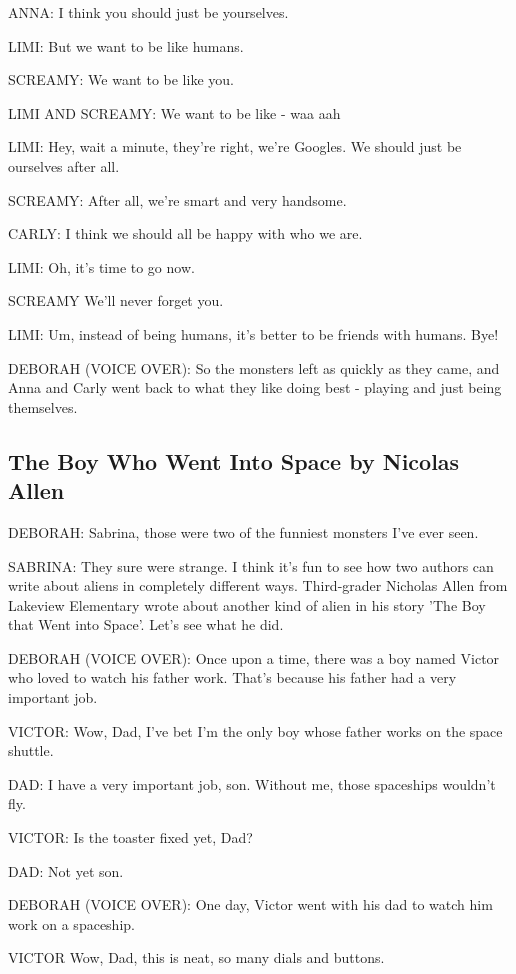 ANNA:
I think you should just be yourselves.

LIMI:
But we want to be like humans.

SCREAMY:
We want to be like you.

LIMI AND SCREAMY:
We want to be like - waa aah

LIMI:
Hey, wait a minute, they're right, we're Googles.
We should just be ourselves after all.

SCREAMY:
After all, we're smart and very handsome.

CARLY:
I think we should all be happy with who we are.

LIMI:
Oh, it's time to go now.

SCREAMY
We'll never forget you.

LIMI:
Um, instead of being humans, it's better to be friends with humans.
Bye!

DEBORAH (VOICE OVER):
So the monsters left as quickly as they came, and Anna and Carly went back to what they like doing best - playing and just being themselves.

\subsection{The Boy Who Went Into Space by Nicolas Allen}

DEBORAH:
Sabrina, those were two of the funniest monsters I've ever seen.

SABRINA:
They sure were strange.
I think it's fun to see how two authors can write about aliens in completely different ways.
Third-grader Nicholas Allen from Lakeview Elementary wrote about another kind of alien in his story 'The Boy that Went into Space'.
Let's see what he did.

DEBORAH (VOICE OVER):
Once upon a time, there was a boy named Victor who loved to watch his father work.
That's because his father had a very important job.

VICTOR:
Wow, Dad, I've bet I'm the only boy whose father works on the space shuttle.

DAD:
I have a very important job, son.
Without me, those spaceships wouldn't fly.

VICTOR:
Is the toaster fixed yet, Dad?

DAD:
Not yet son.

DEBORAH (VOICE OVER):
One day, Victor went with his dad to watch him work on a spaceship.

VICTOR
Wow, Dad, this is neat, so many dials and buttons.

